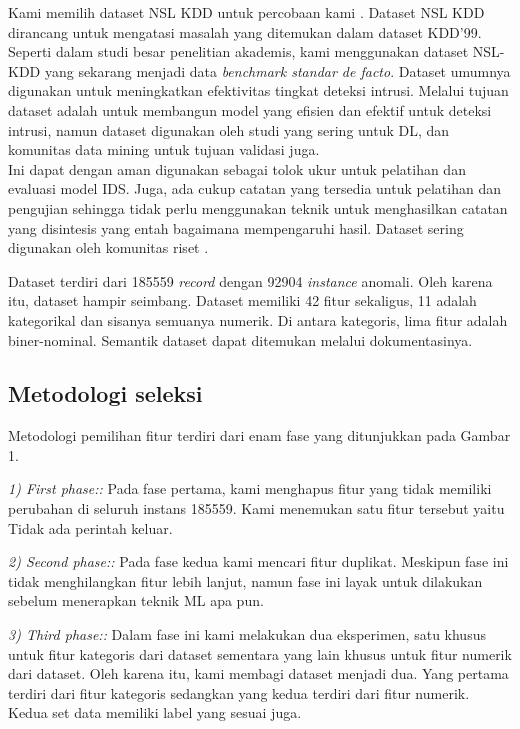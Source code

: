 \documentclass[conference]{IEEEtran}
\begin{document}
Kami memilih dataset NSL KDD untuk percobaan kami \cite{tavallaee2009detailed}. Dataset NSL KDD dirancang untuk mengatasi masalah yang ditemukan dalam dataset KDD'99. Seperti dalam studi besar penelitian akademis, kami menggunakan dataset NSL-KDD yang sekarang menjadi data \emph{benchmark standar de facto}. Dataset umumnya digunakan untuk meningkatkan efektivitas tingkat deteksi intrusi. Melalui tujuan dataset adalah untuk membangun model yang efisien dan efektif untuk deteksi intrusi, namun dataset digunakan oleh studi yang sering untuk DL, dan komunitas data mining untuk tujuan validasi juga.\\
Ini dapat dengan aman digunakan sebagai tolok ukur untuk pelatihan dan evaluasi model IDS. Juga, ada cukup catatan yang tersedia untuk pelatihan dan pengujian sehingga tidak perlu menggunakan teknik untuk menghasilkan catatan yang disintesis yang entah bagaimana mempengaruhi hasil.
Dataset sering digunakan oleh komunitas riset \cite{Zhou2020AnEN, ibrahim2013comparison, aggarwal2015analysis, ingre2015performance, lakhina2010feature, revathi2013detailed, zuech2015survey, sharafaldin2018towards, protic2018review, dhanabal2015study}.

Dataset terdiri dari 185559 \emph{record} dengan 92904 \emph{instance} anomali. Oleh karena itu, dataset hampir seimbang. Dataset memiliki 42 fitur sekaligus, 11 adalah kategorikal dan sisanya semuanya numerik. Di antara kategoris, lima fitur adalah biner-nominal. Semantik dataset dapat ditemukan melalui dokumentasinya.

\subsection{Metodologi seleksi}

Metodologi pemilihan fitur terdiri dari enam fase yang ditunjukkan pada Gambar 1.

\emph{1) First phase::} Pada fase pertama, kami menghapus fitur yang tidak memiliki perubahan di seluruh instans 185559. Kami menemukan satu fitur tersebut yaitu Tidak ada perintah keluar.

\emph{2) Second phase::} Pada fase kedua kami mencari fitur duplikat. Meskipun fase ini tidak menghilangkan fitur lebih lanjut, namun fase ini layak untuk dilakukan sebelum menerapkan teknik ML apa pun.

\emph{3) Third phase::} Dalam fase ini kami melakukan dua eksperimen, satu khusus untuk fitur kategoris dari dataset sementara yang lain khusus untuk fitur numerik dari dataset. Oleh karena itu, kami membagi dataset menjadi dua. Yang pertama terdiri dari fitur kategoris sedangkan yang kedua terdiri dari fitur numerik. Kedua set data memiliki label yang sesuai juga.
\end{document}
